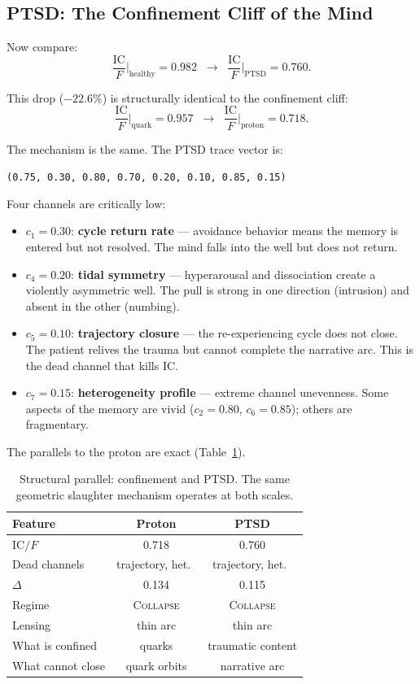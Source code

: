 \documentclass[
  aps,
  prd,
  twocolumn,
  superscriptaddress,
  nofootinbib,
  floatfix
]{revtex4-2}
\newcommand{\beq}{\begin{equation}}
\newcommand{\eeq}{\end{equation}}
\newcommand{\regime}[1]{\textsc{#1}}
\newcommand{\IC}{\mathrm{IC}}
\begin{document}
\subsection{PTSD: The Confinement Cliff of the Mind}

Now compare:
\beq\label{eq:ptsd_cliff}
  \frac{\IC}{F}\bigg|_{\text{healthy}} = 0.982
  \;\;\longrightarrow\;\;
  \frac{\IC}{F}\bigg|_{\text{PTSD}} = 0.760.
\eeq

This drop ($-22.6\%$) is structurally identical to the
confinement cliff:
\beq\label{eq:quark_cliff}
  \frac{\IC}{F}\bigg|_{\text{quark}} = 0.957
  \;\;\longrightarrow\;\;
  \frac{\IC}{F}\bigg|_{\text{proton}} = 0.718.
\eeq

The mechanism is the same.  The PTSD trace vector is:
\begin{center}
\texttt{(0.75, 0.30, 0.80, 0.70, 0.20, 0.10, 0.85, 0.15)}
\end{center}

Four channels are critically low:
\begin{itemize}
\item $c_1 = 0.30$: \textbf{cycle return rate} --- avoidance
  behavior means the memory is entered but not resolved.
  The mind falls into the well but does not return.
\item $c_4 = 0.20$: \textbf{tidal symmetry} ---
  hyperarousal and dissociation create a violently
  asymmetric well.  The pull is strong in one direction
  (intrusion) and absent in the other (numbing).
\item $c_5 = 0.10$: \textbf{trajectory closure} --- the
  re-experiencing cycle does not close.  The patient
  relives the trauma but cannot complete the narrative arc.
  This is the dead channel that kills IC.
\item $c_7 = 0.15$: \textbf{heterogeneity profile} ---
  extreme channel unevenness.  Some aspects of the memory
  are vivid ($c_2 = 0.80$, $c_6 = 0.85$); others are
  fragmentary.
\end{itemize}

The parallels to the proton are exact (Table~\ref{tab:parallel}).

\begin{table}[t]
\caption{\label{tab:parallel}Structural parallel: confinement
and PTSD.  The same geometric slaughter mechanism operates at
both scales.}
\begin{ruledtabular}
\begin{tabular}{lcc}
Feature & Proton & PTSD \\
\hline
$\IC/F$ & 0.718 & 0.760 \\
Dead channels & trajectory, het.\ & trajectory, het.\ \\
$\Delta$ & 0.134 & 0.115 \\
Regime & \regime{Collapse} & \regime{Collapse} \\
Lensing & thin arc & thin arc \\
What is confined & quarks & traumatic content \\
What cannot close & quark orbits & narrative arc \\
\end{tabular}
\end{ruledtabular}
\end{table}
\end{document}
